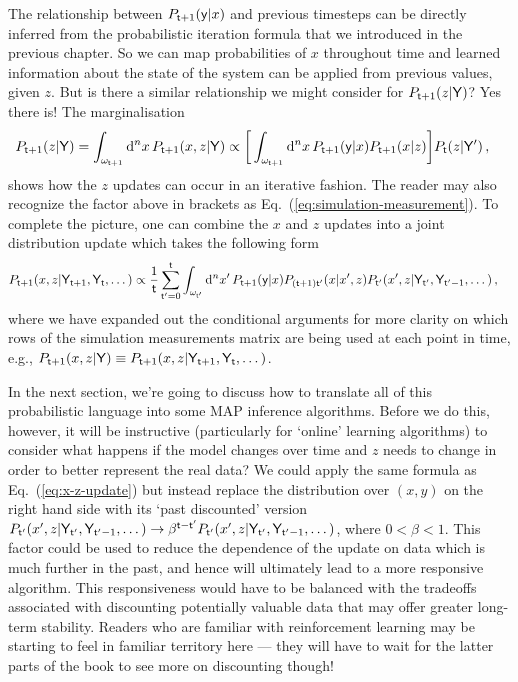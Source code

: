 The relationship between $P_{{\sf t}+1}({\sf y}\vert x)$ and previous timesteps can be directly inferred from the probabilistic iteration formula that we introduced in the previous chapter. So we can map probabilities of $x$ throughout time and learned information about the state of the system can be applied from previous values, given $z$. But is there a similar relationship we might consider for $P_{{\sf t}+1}(z\vert {\sf Y})$? Yes there is! The marginalisation
\begin{align} 
P_{{\sf t}+1}(z\vert {\sf Y}) = \int_{\omega_{{\sf t}+1}} {\rm d}^nx \, P_{{\sf t}+1}(x,z\vert {\sf Y}) &\propto \bigg[ \int_{\omega_{{\sf t}+1}} {\rm d}^nx \, P_{{\sf t}+1}({\sf y}\vert x) P_{{\sf t}+1}(x\vert z) \bigg] P_{{\sf t}}(z\vert {\sf Y}') \label{eq:z-update}\,,
\end{align}
shows how the $z$ updates can occur in an iterative fashion. The reader may also recognize the factor above in brackets as Eq.~(\ref{eq:simulation-measurement}). To complete the picture, one can combine the $x$ and $z$ updates into a joint distribution update which takes the following form 
\begin{align} 
P_{{\sf t}+1}(x,z\vert {\sf Y}_{{\sf t}+1}, {\sf Y}_{{\sf t}}, \dots ) &\propto \frac{1}{{\sf t}}\sum_{{\sf t}'=0}^{{\sf t}}\int_{\omega_{{\sf t}'}} {\rm d}^nx' \, P_{{\sf t}+1}({\sf y}\vert x) P_{({\sf t}+1){\sf t}'}(x\vert x', z) P_{{\sf t}'}(x',z\vert {\sf Y}_{{\sf t}'}, {\sf Y}_{{\sf t}'-1}, \dots) \label{eq:x-z-update}\,,
\end{align}
where we have expanded out the conditional arguments for more clarity on which rows of the simulation measurements matrix are being used at each point in time, e.g., $P_{{\sf t}+1}(x,z \vert {\sf Y}) \equiv P_{{\sf t}+1}(x,z \vert {\sf Y}_{{\sf t}+1}, {\sf Y}_{{\sf t}}, \dots)$.

In the next section, we're going to discuss how to translate all of this probabilistic language into some MAP inference algorithms. Before we do this, however, it will be instructive (particularly for `online' learning algorithms) to consider what happens if the model changes over time and $z$ needs to change in order to better represent the real data? We could apply the same formula as Eq.~(\ref{eq:x-z-update}) but instead replace the distribution over $(x,y)$ on the right hand side with its `past discounted' version $P_{{\sf t}'}(x',z\vert {\sf Y}_{{\sf t}'}, {\sf Y}_{{\sf t}'-1}, \dots) \rightarrow \beta^{{\sf t}-{\sf t}'}P_{{\sf t}'}(x',z\vert {\sf Y}_{{\sf t}'}, {\sf Y}_{{\sf t}'-1}, \dots)$, where $0 < \beta < 1$. This factor could be used to reduce the dependence of the update on data which is much further in the past, and hence will ultimately lead to a more responsive algorithm. This responsiveness would have to be balanced with the tradeoffs associated with discounting potentially valuable data that may offer greater long-term stability. Readers who are familiar with reinforcement learning may be starting to feel in familiar territory here --- they will have to wait for the latter parts of the book to see more on discounting though!



